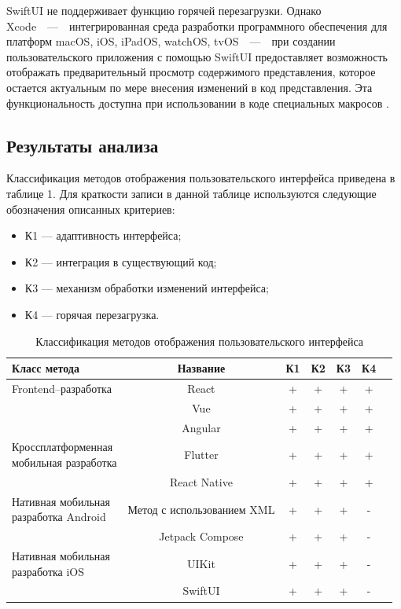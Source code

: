 SwiftUI не поддерживает функцию горячей перезагрузки.
Однако Xcode~~---~~интегрированная среда разработки программного обеспечения для платформ macOS, iOS, iPadOS, watchOS, tvOS~~---~~при создании пользовательского приложения с помощью SwiftUI предоставляет возможность отображать предварительный просмотр содержимого представления, которое остается актуальным по мере внесения изменений в код представления. 
Эта функциональность доступна при использовании в коде специальных макросов \cite{swiftui-preview}.

\subsection{Результаты анализа} 

Классификация методов отображения пользовательского интерфейса приведена в таблице 1. %
Для краткости записи в данной таблице используются следующие обозначения описанных критериев:
 \begin{itemize}[label=---]
	\item К1 --- адаптивность интерфейса;
	\item К2 --- интеграция в существующий код;
	\item К3 --- механизм обработки изменений интерфейса;
	\item К4 --- горячая перезагрузка.
\end{itemize}
\clearpage
\begin{table}[h]
	\label{table1}
	\begin{center}
		\caption{Классификация методов отображения пользовательского интерфейса}
		\begin{tabular}{|p{5.5cm}|c|c|c|c|c|c|}
			\hline
			\textbf{Класс метода} & \textbf{Название} & 
			\textbf{К1} & \textbf{К2} & \textbf{К3} & \textbf{К4}\\
			\hline
			{Frontend--разработка} & 
			React & 
			+ & + & + & + \\
			\cline{2-6} & Vue & 
			+ & + & + & + \\
			\cline{2-6} &Angular & 
			+ & + & + & + \\
			\hline
			{Кроссплатформенная  \newline{} мобильная разработка} & 
			Flutter &  
			+ & + & + & + \\
			\cline{2-6} & React Native &  
			+ & + & + & + \\
			\hline
			{Нативная мобильная \newline{} разработка Android} & 
			Метод с использованием XML &  
			+ & + & + & - \\
			\cline{2-6} & Jetpack Compose &  
			+ & + & + & - \\
			\hline
			{Нативная мобильная \newline{} разработка iOS} & 
			UIKit &  
			+ & + & + & - \\
			\cline{2-6} & SwiftUI &  
			+ & + & + & - \\
			\hline
		\end{tabular}	
	\end{center}
\end{table}

